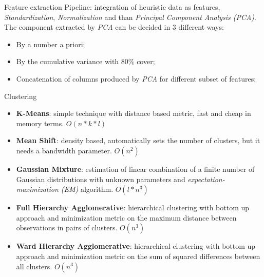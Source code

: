 \documentclass{beamer}
\begin{document}
\begin{frame}{Feature extraction}
Pipeline: integration of heuristic data as features, \textit{Standardization}, \textit{Normalization} and than \textit{Principal Component Analysis (PCA)}. 
\vfill
The component extracted by \textit{PCA} can be decided in 3 different ways:
\begin{itemize}
	\item By a number a priori;
	\item By the cumulative variance with $80\%$ cover;
	\item Concatenation of columns produced by \textit{PCA} for different subset of features;
\end{itemize}
\end{frame}

\begin{frame}{Clustering}
\begin{itemize}
	\item \textbf{K-Means}: simple technique with distance based metric, fast and cheap in memory terms. $O(n*k*l)$
	\item \textbf{Mean Shift}: density based, automatically sets the number of clusters, but it needs a bandwidth parameter. $O(n ^ 2)$
	\item \textbf{Gaussian Mixture}: estimation of linear combination of a finite number of Gaussian distributions with unknown parameters and \textit{expectation-maximization (EM)} algorithm. $O(l * n ^ 3)$
	\item \textbf{Full Hierarchy Agglomerative}: hierarchical clustering with bottom up approach and minimization metric on the maximum distance between observations in pairs of clusters. $O(n ^ 3)$
	\item \textbf{Ward Hierarchy Agglomerative}: hierarchical clustering with bottom up approach and minimization metric on the sum of squared differences between all clusters. $O(n ^ 3)$
\end{itemize}
\end{frame}
\end{document}
